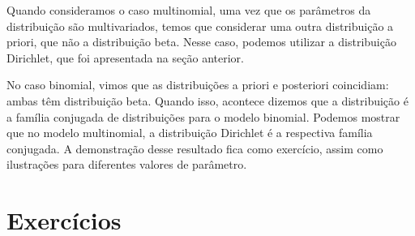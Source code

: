 \documentclass[]{book}
\begin{document}
Quando consideramos o caso multinomial, uma vez que os parâmetros da distribuição são multivariados, temos que considerar uma outra distribuição a priori, que não a distribuição beta. Nesse caso, podemos utilizar a distribuição Dirichlet, que foi apresentada na seção anterior.

No caso binomial, vimos que as distribuições a priori e posteriori coincidiam: ambas têm distribuição beta. Quando isso, acontece dizemos que a distribuição é a família conjugada de distribuições para o modelo binomial. Podemos mostrar que no modelo multinomial, a distribuição Dirichlet é a respectiva família conjugada. A demonstração desse resultado fica como exercício, assim como ilustrações para diferentes valores de parâmetro.

\hypertarget{exercicios}{%
\section{Exercícios}\label{exercicios}}
\end{document}
